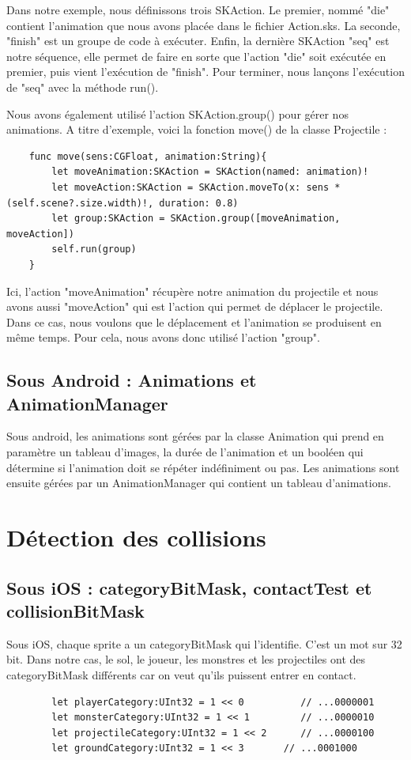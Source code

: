 \documentclass{article}
\begin{document}
    Dans notre exemple, nous définissons trois SKAction. Le premier, nommé "die" contient l'animation que nous avons placée dans le fichier Action.sks. La seconde, "finish" est un groupe de code à exécuter. Enfin, la dernière SKAction "seq" est notre séquence, elle permet de faire en sorte que l'action "die" soit exécutée en premier, puis vient l'exécution de "finish". Pour terminer, nous lançons l'exécution de "seq" avec la méthode run().
    \bigskip
    
    Nous avons également utilisé l'action SKAction.group() pour gérer nos animations. A titre d'exemple, voici la fonction move() de la classe Projectile : 
    
    \begin{verbatim}
    func move(sens:CGFloat, animation:String){
        let moveAnimation:SKAction = SKAction(named: animation)!
        let moveAction:SKAction = SKAction.moveTo(x: sens * (self.scene?.size.width)!, duration: 0.8)
        let group:SKAction = SKAction.group([moveAnimation, moveAction])
        self.run(group)
    }
    \end{verbatim}
    
    Ici, l'action "moveAnimation" récupère notre animation du projectile et nous avons aussi "moveAction" qui est l'action qui permet de déplacer le projectile. 
    Dans ce cas, nous voulons que le déplacement et l'animation se produisent en même temps. Pour cela, nous avons donc utilisé l'action "group".
        
        \subsection{Sous Android : Animations et AnimationManager}
Sous android, les animations sont gérées par la classe Animation qui prend en paramètre un tableau d'images, la durée de l'animation et un booléen qui détermine si l'animation doit se répéter indéfiniment ou pas. Les animations sont ensuite gérées par un AnimationManager qui contient un tableau d'animations. 

\cleardoublepage
       
 \section{Détection des collisions}

\subsection{Sous iOS : categoryBitMask, contactTest et collisionBitMask}
Sous iOS, chaque sprite a un categoryBitMask qui l'identifie. C'est un mot sur 32 bit. Dans notre cas, le sol, le joueur, les monstres et les projectiles ont des categoryBitMask différents car on veut qu'ils puissent entrer en contact.
\begin{verbatim}
        let playerCategory:UInt32 = 1 << 0      	// ...0000001
        let monsterCategory:UInt32 = 1 << 1     	// ...0000010
        let projectileCategory:UInt32 = 1 << 2  	// ...0000100
        let groundCategory:UInt32 = 1 << 3       // ...0001000
\end{verbatim}
\end{document}
